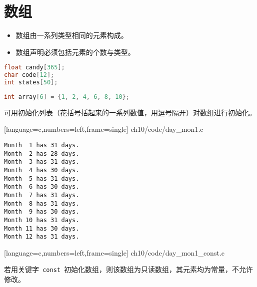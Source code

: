 \section{数组}

\begin{frame}[fragile]\ft{\secname}
\begin{itemize}
\item 数组由一系列类型相同的元素构成。\\[0.2in]
\item 数组声明必须包括元素的个数与类型。
\end{itemize}

\begin{lstlisting}[language=c,backgroundcolor=\color{red!20}]
float candy[365];
char code[12];
int states[50]; 
\end{lstlisting}

\end{frame}

\begin{frame}[fragile]
\begin{lstlisting}[language=c,backgroundcolor=\color{red!20}]
int array[6] = {1, 2, 4, 6, 8, 10};
\end{lstlisting}
可用初始化列表（花括号括起来的一系列数值，用逗号隔开）对数组进行初始化。
\end{frame}

\begin{frame}[fragile]
  
  [language=c,numbers=left,frame=single]
  {ch10/code/day_mon1.c}
\end{frame}

\begin{frame}[fragile]
\begin{lstlisting}[backgroundcolor=\color{red!20}]
Month  1 has 31 days.
Month  2 has 28 days.
Month  3 has 31 days.
Month  4 has 30 days.
Month  5 has 31 days.
Month  6 has 30 days.
Month  7 has 31 days.
Month  8 has 31 days.
Month  9 has 30 days.
Month 10 has 31 days.
Month 11 has 30 days.
Month 12 has 31 days.
\end{lstlisting}
\end{frame}

\begin{frame}[fragile]

[language=c,numbers=left,frame=single]
{ch10/code/day_mon1_const.c}
\end{frame}

\begin{frame}[fragile]
若用关键字\lstinline| const |初始化数组，则该数组为只读数组，其元素均为常量，不允许修改。
\end{frame}

